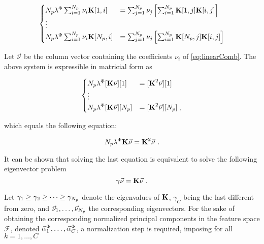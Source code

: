 \begin{equation}
\begin{cases}
N_p\lambda^\Phi \sum_{i=1}^{N_p}\nu_i{\textbf{K}[1,i]} &= \sum_{j=1}^{N_p}\nu_j\left[\sum_{i=1}^{N_p}{\textbf{K}[1,j]}{\textbf{K}[i,j]}\right]\\
\vdots \\
N_p\lambda^\Phi \sum_{i=1}^{N_p}\nu_i{\textbf{K}[N_p,i]} &= \sum_{j=1}^{N_p}\nu_j\left[\sum_{i=1}^{N_p}{\textbf{K}[N_p,j]}{\textbf{K}[i,j]}\right]
\end{cases}
\end{equation}


Let $\vec{\nu}$ be the column vector containing the coefficients $\nu_i$ of \eqref{eq:linearComb}. The above system is expressible in matricial form as

\begin{equation}
\begin{cases}
N_p\lambda^\Phi [\textbf{K}\vec{\nu}][1] &= [\textbf{K}^2\vec{\nu}][1]\\
\vdots \\
N_p\lambda^\Phi [\textbf{K}\vec{\nu}][N_p] &= [\textbf{K}^2\vec{\nu}][N_p]\mbox{ ,}
\end{cases}
\end{equation}

which equals the following equation:

\begin{equation}
N_p\lambda^\Phi\textbf{K}\vec{\nu} = \textbf{K}^2\vec{\nu} \mbox{ .}
\end{equation}

It can be shown that solving the last equation is equivalent to solve the following eigenvector problem
\begin{equation}\label{eq:eigProblemKPCA}
\gamma\vec{\nu} = \textbf{K}\vec{\nu} \mbox{ .}
\end{equation}

Let $\gamma_1\geq\gamma_2\geq\dots\geq\gamma_{N_p}$ denote the eigenvalues of $\textbf{K}$, $\gamma_C$ being the last different from zero, and $\vec{\nu}_1,\dots, \vec{\nu}_{N_p}$ the corresponding eigenvectors. For the sake of obtaining the corresponding normalized principal components in the feature space $\mathcal{F}$, denoted $\vec{\alpha}^\Phi_1,\dots, \vec{\alpha}^\Phi_C$, a normalization step is required, imposing for all $k=1,\dots, C$

